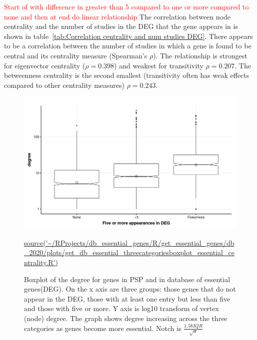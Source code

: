 \textcolor{red}{Start of with difference in greater than 5 compared to one or more compared to none and then at end do linear relationship}
The correlation between node centrality and the number of studies in the DEG that the gene appears in is shown in table~\ref{tab:Correlation centrality and num studies DEG}. There appears to be a correlation between the number of studies in which a gene is found to be central and its centrality measure (Spearman's $\rho$). The relationship is strongest for eigenvector centrality ($\rho=0.398$) and weakest for transitivity $\rho=0.207$. The betweenness centrality is the second smallest (transitivity often has weak effects compared to other centrality measures) $\rho=0.243$.


\begin{figure}
    \centering
    \includegraphics[width=\textwidth]{images/chapter3/ggplot2/db_essential_genes/theme/Rplot_single_boxplot_three_categories.png}
    \caption{Boxplot of the degree for genes in PSP and in database of essential genes(DEG). On the x axis are three groups: those genes that do not appear in the DEG, those with at least one entry but less than five and those with five or more. Y axis is log10 transform of vertex (node) degree. The graph shows degree increasing across the three categories as genes become more essential. Notch is $\frac{1.58 IQR}{\sqrt{n}}$}
    \tiny\url{source('~/RProjects/db_essential_genes/R/get_essential_genes/db_2020/plots/get_db_essential_threecategoriesboxplot_essential_centrality.R')}
    \label{fig:boxplot_three_groups_DEG_logdegree1}
\end{figure}




